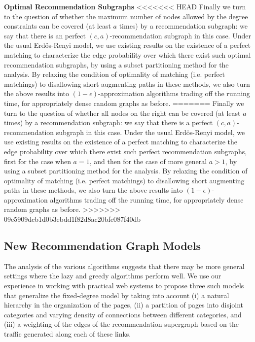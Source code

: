{\bf Optimal Recommendation Subgraphs}
<<<<<<< HEAD
Finally we turn to the question of whether the maximum number of nodes allowed
by the degree constraints can be covered (at least $a$ times) by a recommendation
subgraph: we say that there is an perfect $(c,a)$-recommendation subgraph in this
case. Under the usual Erd\"os-Renyi model, we use existing results on the
existence of a perfect matching to characterize the edge probability over which
there exist such optimal recommendation subgraphs, by using a subset partitioning
method for the analysis. By relaxing the condition of optimality of matching (i.e.
perfect matchings) to disallowing short augmenting paths in these methods, we also
turn the above results into $(1-\epsilon)$-approximation algorithms trading off
the running time, for appropriately dense random graphs as before. \vs
=======
Finally we turn to the question of whether all nodes on the right can be covered
(at least $a$ times) by a recommendation subgraph: we say that there is a
perfect $(c,a)$-recommendation subgraph in this case. Under the usual
Erd\"os-Renyi model, we use existing results on the existence of a perfect
matching to characterize the edge probability over which there exist such
perfect recommendation subgraphs, first for the case when $a=1$, and then for
the case of more general $a > 1$, by using a subset partitioning method for the
analysis. By relaxing the condition of optimality of matching (i.e. perfect
matchings) to disallowing short augmenting paths in these methods, we also turn
the above results into $(1-\epsilon)$-approximation algorithms trading off the
running time, for appropriately dense random graphs as before. \vs
>>>>>>> 09e5909dcb1d0b3ebdd1f82d8ac20bfe087f40db

\subsection{New Recommendation Graph Models}
The analysis of the various algorithms suggests that there may be more general
settings where the lazy and greedy algorithms perform well. We use our
experience in working with practical web systems to propose three such models
that generalize the fixed-degree model by taking into account (i) a natural
hierarchy in the organization of the pages, (ii) a partition of pages into
disjoint categories and varying density of connections between different
categories, and (iii) a weighting of the edges of the recommendation supergraph
based on the traffic generated along each of these links. \vs

